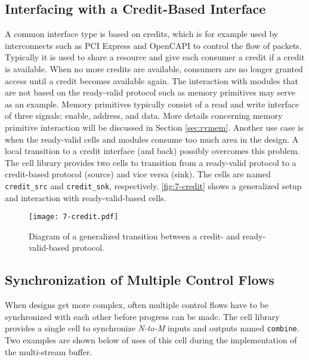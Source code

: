 \subsection{Interfacing with a Credit-Based Interface}
A common interface type is based on credits, which is for example used by interconnects such as PCI Express and OpenCAPI to control the flow of packets. Typically it is used to share a resource and give each consumer a credit if a credit is available. When no more credits are available, consumers are no longer granted access until a credit becomes available again. The interaction with modules that are not based on the ready-valid protocol such as memory primitives may serve as an example. Memory primitives typically consist of a read and write interface of three signals: enable, address, and data. More details concerning memory primitive interaction will be discussed in Section \ref{sec:rvmem}. Another use case is when the ready-valid cells and modules consume too much area in the design. A local transition to a credit interface (and back) possibly overcomes this problem.\\
The cell library provides two cells to transition from a ready-valid protocol to a credit-based protocol (source) and vice versa (sink). The cells are named \texttt{credit\_src} and \texttt{credit\_snk}, respectively. \autoref{fig:7-credit} shows a generalized setup and interaction with ready-valid-based cells.

\begin{figure}[h]
  \centering
  \texttt{[image: 7-credit.pdf]}
  \caption{Diagram of a generalized transition between a credit- and ready-valid-based protocol.}
  \label{fig:7-credit}
\end{figure}



\subsection{Synchronization of Multiple Control Flows}
When designs get more complex, often multiple control flows have to be synchronized with each other before progress can be made. The cell library provides a single cell to synchronize \textit{N-to-M} inputs and outputs named \texttt{combine}. Two examples are shown below of uses of this cell during the implementation of the multi-stream buffer.



